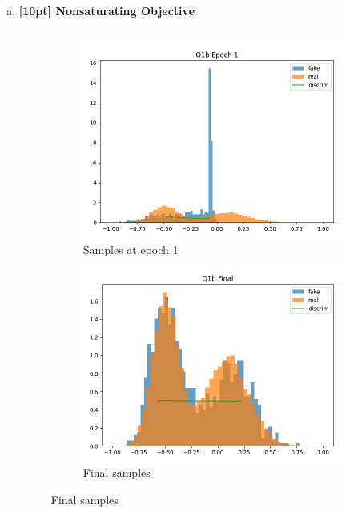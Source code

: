 \documentclass{article}
\begin{document}
\begin{enumerate}[(a)]
\item {\bf [10pt] Nonsaturating Objective} \\\\
\begin{figure}[H]
    \centering
    \begin{subfigure}{0.45\textwidth}
        \centering
        \includegraphics[width=\textwidth]{figures/q1b_epoch1.png}
        \caption{Samples at epoch 1}
    \end{subfigure}
    \begin{subfigure}{0.45\textwidth}
        \centering
        \includegraphics[width=\textwidth]{figures/q1b_final.png}
        \caption{Final samples}
    \end{subfigure}

\end{figure}
\end{enumerate}
\end{document}
